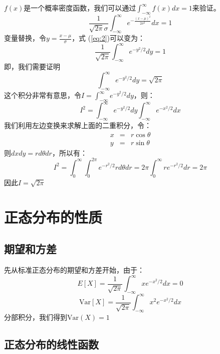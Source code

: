 \documentclass[11pt]{article}
\begin{document}
\(f(x)\)是一个概率密度函数，我们可以通过\(\int_{-\infty}^{\infty}f(x)dx = 1\)来验证。
\begin{equation}
\label{eq:2}
\frac{1}{\sqrt{2\pi}\sigma}\int_{-\infty}^{\infty} e^{-\frac{(x-\mu)^{2}}{2\sigma^{2}}}dx = 1
\end{equation}
变量替换，令\(y = \tfrac{x-\mu}{\sigma}\)，式 (\ref{eq:2})可以变为：
\begin{equation}
\label{eq:3}
\frac{1}{\sqrt{2\pi}}\int_{-\infty}^{\infty} e^{-y^{2}/2}dy = 1
\end{equation}
即，我们需要证明
\begin{equation}
\label{eq:4}
\int_{-\infty}^{\infty} e^{-y^{2}/2}dy = \sqrt{2\pi}
\end{equation}
这个积分非常有意思，令\(I = \int_{-\infty}^{\infty} e^{-y^{2}/2}dy\)，则：
\begin{equation}
\label{eq:5}
I^{2} = \int_{-\infty}^{\infty} e^{-y^{2}/2}dy \int_{-\infty}^{\infty} e^{-x^{2}/2}dx
\end{equation}
我们利用左边变换来求解上面的二重积分，令：
\begin{eqnarray}
\label{eq:6}
x&=&r\cos\theta \\
y&=&r\sin\theta
\end{eqnarray}
则\(dxdy = rd\theta dr\)，所以有：
\begin{equation}
\label{eq:7}
I^{2} = \int_{0}^{\infty}\int_{0}^{2\pi}e^{-r^{2}/2}rd\theta dr = 2\pi \int_{0}^{\infty}re^{-r^{2}/2}dr = 2\pi
\end{equation}
因此\(I = \sqrt{2\pi}\)
\section{正态分布的性质}
\label{sec:orgb4a55f7}


\subsection{期望和方差}
\label{sec:orgd1a7ff1}

先从标准正态分布的期望和方差开始，由于：
\begin{equation}
\label{eq:8}
E[X] = \frac{1}{\sqrt{2\pi}}\int_{-\infty}^{\infty} xe^{-x^{2}/2}dx = 0
\end{equation}
\begin{equation}
\label{eq:9}
\mathrm{Var}[X] = \frac{1}{\sqrt{2\pi}}\int_{-\infty}^{\infty} x^{2} e^{-x^{2}/2}dx
\end{equation}
分部积分，我们得到\(\mathrm{Var}(X) = 1\)
\subsection{正态分布的线性函数}
\label{sec:org80480d4}
\end{document}
